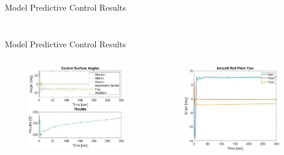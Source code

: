 \documentclass[aspectratio=169]{beamer}
\begin{document}
\begin{frame}{Model Predictive Control Results}
\begin{columns}
\begin{column}{0.45\textwidth}
\begin{figure}
            \end{figure}
        \end{column}
    \end{columns}
\end{frame}

\begin{frame}{Model Predictive Control Results}
    \begin{columns}
        \begin{column}{0.5\textwidth}
            \begin{figure}
                \centering
                \includegraphics[width=1\textwidth]{MPC_Disturbance_Controls.jpg}
            \end{figure}
        \end{column}
        \begin{column}{0.5\textwidth} 
            \begin{figure}
                \centering
                \includegraphics[width=1\textwidth]{MPC_Disturbance_Roll_Pitch_Yaw.jpg}

\end{figure}
\end{column}
\end{columns}
\end{frame}
\end{document}
